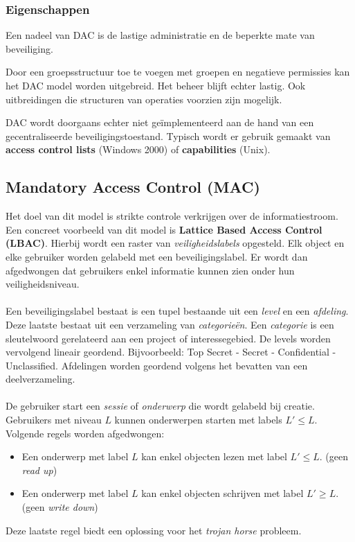 \documentclass[../main.tex]{subfiles}
\begin{document}
\subsubsection{Eigenschappen}
Een nadeel van DAC is de lastige administratie en de beperkte mate van beveiliging.

Door een groepsstructuur toe te voegen met groepen en negatieve permissies kan het DAC model worden uitgebreid. Het beheer blijft echter lastig. Ook uitbreidingen die structuren van operaties voorzien zijn mogelijk.

DAC wordt doorgaans echter niet ge\"implementeerd aan de hand van een gecentraliseerde beveiligingstoestand. Typisch wordt er gebruik gemaakt van \textbf{access control lists} (Windows 2000) of \textbf{capabilities} (Unix).

\subsection{Mandatory Access Control (MAC)}
Het doel van dit model is strikte controle verkrijgen over de informatiestroom. Een concreet voorbeeld van dit model is \textbf{Lattice Based Access Control (LBAC)}. Hierbij wordt een raster van \textit{veiligheidslabels} opgesteld. Elk object en elke gebruiker worden gelabeld met een beveiligingslabel. Er wordt dan afgedwongen dat gebruikers enkel informatie kunnen zien onder hun veiligheidsniveau.
\\\\
Een beveiligingslabel bestaat is een tupel bestaande uit een \textit{level} en een \textit{afdeling}. Deze laatste bestaat uit een verzameling van \textit{categorie\"en}. Een \textit{categorie} is een sleutelwoord gerelateerd aan een project of interessegebied. De levels worden vervolgend lineair geordend. Bijvoorbeeld: Top Secret - Secret - Confidential - Unclassified. Afdelingen worden geordend volgens het bevatten van een deelverzameling.
\\\\
De gebruiker start een \textit{sessie} of \textit{onderwerp} die wordt gelabeld bij creatie. Gebruikers met niveau $L$ kunnen onderwerpen starten met labels $L' \leq L$.  Volgende regels worden afgedwongen:
\begin{itemize}
	\item Een onderwerp met label $L$ kan enkel objecten lezen met label $L' \leq L$. (geen \textit{read up})
	\item Een onderwerp met label $L$ kan enkel objecten schrijven met label $L' \geq L$. (geen \textit{write down})
\end{itemize}
Deze laatste regel biedt een oplossing voor het \textit{trojan horse} probleem.
\end{document}
